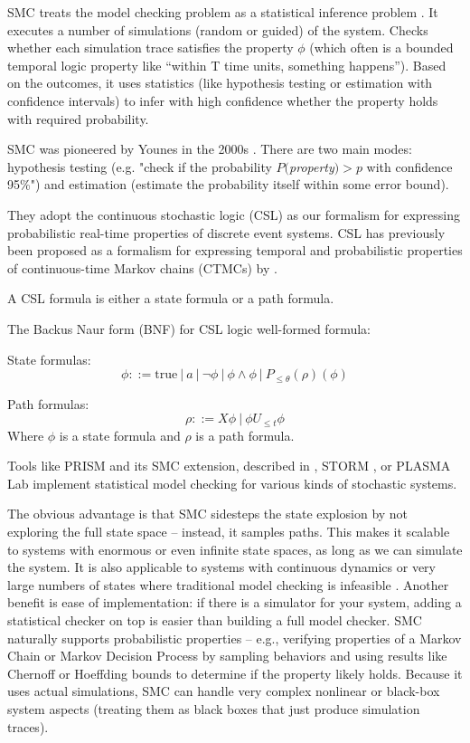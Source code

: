 SMC treats the model checking problem as a statistical inference problem \cite{Younes2006StatisticalPMC}.
It executes a number of simulations (random or guided) of the system. 
Checks whether each simulation trace satisfies the property $\phi$ 
(which often is a bounded temporal logic property like “within T time units,
something happens”). 
Based on the outcomes, it uses statistics (like hypothesis testing or estimation with
confidence intervals) to infer with high confidence whether the property holds with required probability.

SMC was pioneered by Younes in the 2000s \cite{Younes2002AcceptanceSampling}. 
There are two main modes: hypothesis testing (e.g. "check if the probability 
$P($\textit{property}$) > p$ with confidence 95\%") and estimation (estimate the
probability itself within some error bound). 

They adopt the continuous stochastic logic (CSL) as our formalism for expressing 
probabilistic real-time properties of discrete event systems. CSL has previously 
been proposed as a formalism for expressing temporal and probabilistic
properties of continuous-time Markov chains (CTMCs) by \citeauthor{Aziz1996VerifyingCTMC} 
\cite{Aziz1996VerifyingCTMC}.

A CSL formula is either a state formula or a path formula.

The Backus Naur form (BNF) for CSL logic well-formed formula:

State formulas:
\[
    \phi ::= \text{true}\ |\ a\ |\ \neg \phi\ |\ \phi \land \phi\ |\ P_{\leq \theta} (\rho)(\phi)
\]

Path formulas:
\[
    \rho::= X \phi\ |\ \phi U_{\leq t} \phi
\]
Where $\phi$ is a state formula and  $\rho$ is a path formula.

Tools like PRISM and its SMC extension, described in \cite{Kwiatkowska2011PRISM}, 
STORM \cite{Dehnert2017Storm}, or PLASMA Lab \cite{Legay2016PlasmaLab} implement 
statistical model checking for various kinds of stochastic systems.

The obvious advantage is that SMC sidesteps the state explosion by not exploring the full
state space – instead, it samples paths. 
This makes it scalable to systems with enormous or even infinite state
spaces, as long as we can simulate the system. It is also applicable to systems 
with continuous dynamics or very large numbers of states where traditional model 
checking is infeasible . Another benefit is ease of implementation: if there 
is a simulator for your system, adding a statistical checker on top is easier 
than building a full model checker. SMC naturally supports probabilistic properties 
– e.g., verifying properties of a Markov Chain or Markov Decision Process by 
sampling behaviors and using results like Chernoff or Hoeffding bounds to determine 
if the property likely holds. Because it uses actual simulations, SMC can
handle very complex nonlinear or black-box system aspects (treating them as 
black boxes that just produce simulation traces).

